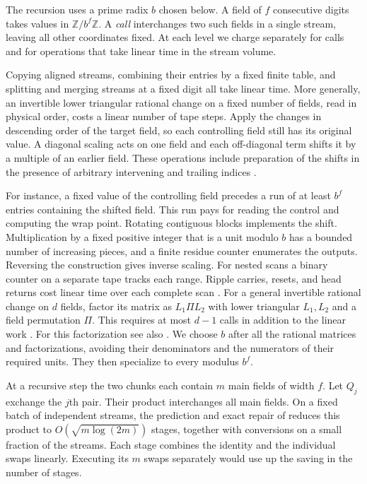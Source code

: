The recursion uses a prime radix $b$ chosen below. A field of $f$
consecutive digits takes values in $\mathbb Z/b^f\mathbb Z$. A
\emph{call} interchanges two such fields in a single stream, leaving
all other coordinates fixed. At each level we charge separately for
calls and for operations that take linear time in the stream volume.

Copying aligned streams, combining their entries by a fixed finite
table, and splitting and merging streams at a fixed digit all take
linear time. More generally, an invertible lower triangular rational
change on a fixed number of fields, read in physical order, costs a
linear number of tape steps. Apply the changes in descending order of
the target field, so each controlling field still has its original
value. A diagonal scaling acts on one field and each off-diagonal
term shifts it by a multiple of an earlier field. These operations
include preparation of the shifts in the presence of arbitrary
intervening and trailing indices \cite[Lemmas~3 and~4]{Tape}.

For instance, a fixed value of the controlling field precedes a run of
at least $b^f$ entries containing the shifted field. This run pays for
reading the control and computing the wrap point. Rotating contiguous
blocks implements the shift. Multiplication by a fixed positive
integer that is a unit modulo $b$ has a bounded number of increasing
pieces, and a finite residue counter enumerates the outputs. Reversing
the construction gives inverse scaling. For nested scans a binary
counter on a separate tape tracks each range. Ripple carries, resets,
and head returns cost linear time over each complete scan
\cite[Section~2]{Tape}. For a general invertible rational change on
$d$ fields, factor its matrix as $L_1\Pi L_2$ with lower triangular
$L_1,L_2$ and a field permutation $\Pi$. This requires at most $d-1$
calls in addition to the linear work \cite[Lemma~9]{Tape}. For this factorization see also
\cite{Grigoriev1982}. We choose $b$ after all the rational matrices and
factorizations, avoiding their denominators and the numerators of their
required units. They then specialize to every modulus $b^f$.

At a recursive step the two chunks each contain $m$ main fields of
width $f$. Let $Q_j$ exchange the $j$th pair. Their product
interchanges all main fields. On a fixed batch of independent streams,
the prediction and exact repair of
\cite[Theorem~]{oaF} reduces this product to
$O(\sqrt{m\log(2m)})$ stages, together with conversions on a small
fraction of the streams. Each stage combines the identity and the
individual swaps linearly. Executing its $m$ swaps separately would
use up the saving in the number of stages.

